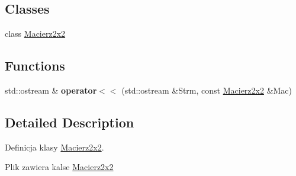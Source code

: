 \subsection*{Classes}
\begin{DoxyCompactItemize}
\item 
class \hyperlink{class_macierz2x2}{Macierz2x2}
\end{DoxyCompactItemize}
\subsection*{Functions}
\begin{DoxyCompactItemize}
\item 
\hypertarget{_macierz2x2_8hh_aa3eba72acf9e09b901351ce2bc5edf2f}{std\+::ostream \& {\bfseries operator$<$$<$} (std\+::ostream \&Strm, const \hyperlink{class_macierz2x2}{Macierz2x2} \&Mac)}\label{_macierz2x2_8hh_aa3eba72acf9e09b901351ce2bc5edf2f}

\end{DoxyCompactItemize}


\subsection{Detailed Description}
Definicja klasy \hyperlink{class_macierz2x2}{Macierz2x2}. 

Plik zawiera kalse \hyperlink{class_macierz2x2}{Macierz2x2} 